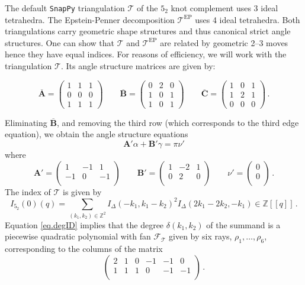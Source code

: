 \documentclass[12pt]{amsart}
\theoremstyle{definition}
\theoremstyle{remark}
\def\BZ{\mathbb Z}
\def\calF{\mathcal F}
\def\a{\alpha}
\def\d{\delta}
\def\lbl{\label}
\newcommand{\CT}{\mathcal{T}}
\def\ID{I_{\Delta}}
\def\EP{\mathrm{EP}}
\newcommand{\mb}{\mathbf}
\begin{document}
The default {\tt SnapPy} triangulation $\CT$ of the $5_2$ knot  complement uses 3 ideal 
tetrahedra. The Epstein-Penner decomposition $\CT^{\EP}$ uses 
4 ideal tetrahedra. Both triangulations carry geometric shape
structures and thus canonical strict angle structures. One can show that
$\CT$ and $\CT^{\EP}$ are related by geometric 2--3 moves hence they have
equal indices. For reasons of efficiency, we will work with the triangulation
$\CT$. Its angle structure matrices are given by:

$$
\overline{\mb A} =
\left(
\begin{array}{ccc}
 1 & 1 & 1 \\
 0 & 0 & 0 \\
 1 & 1 & 1 
\end{array}
\right)
\qquad
\overline{\mb B} =
\left(
\begin{array}{ccc}
 0 & 2 & 0 \\
 1 & 0 & 1 \\
 1 & 0 & 1 
\end{array}
\right)
\qquad
\overline{\mb C} =
\left(
\begin{array}{ccc}
 1 & 0 & 1 \\
 1 & 2 & 1 \\
 0 & 0 & 0 
\end{array}
\right) \, .
$$

Eliminating $\overline{\mb B}$, and removing the third row (which corresponds 
to the third edge equation), we obtain the angle
structure equations
$$
\mb A' \a + \mb B' \gamma = \pi \nu' 
$$
where
$$
\mb A'=
\left(
\begin{array}{ccc}
 1 & -1 & 1 \\
 -1 & 0 & -1 \\
\end{array}
\right)
\qquad 
\mb B'=
\left(
\begin{array}{ccc}
 1 & -2 & 1 \\
 0 & 2 & 0 \\
\end{array}
\right)
\qquad 
\nu'=
\left(
\begin{array}{c}
 0 \\
 0 \\
\end{array}
\right) \, .
$$
The index of $\CT$ is given by
\begin{equation}
\lbl{eq.ind.52}
I_{5_2}(0)(q)=\sum_{(k_1,k_2) \in \BZ^2} \ID(-k_1,k_1-k_2)^2 \ID(2 k_1-2 k_2,-k_1)
\in \BZ[[q]] \, .
\end{equation}
Equation \eqref{eq.degID} implies that the degree $\d(k_1,k_2)$ of the 
summand is a piecewise quadratic polynomial with fan $\calF_{\CT}$
given by six rays, $\rho_1, \ldots, \rho_6$, corresponding to the columns of the matrix
$$
\left(
\begin{array}{cccccc}
 2 & 1 & 0 & -1 & -1 & 0 \\
 1 & 1 & 1 & 0 & -1 & -1 \\
\end{array}
\right) \, .
$$
\end{document}
